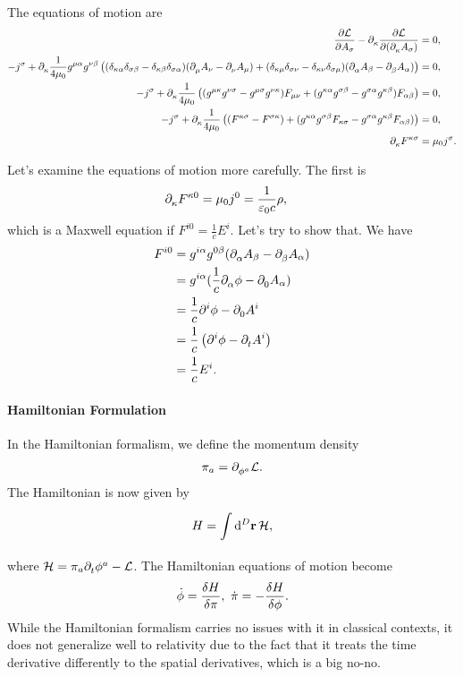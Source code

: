 The equations of motion are
\begin{align*}
	\pdv{\lag}{A_{\sigma}} - \del{\kappa}{\pdv{\lag}{(\del{\kappa}{A_{\sigma}})}} &= 0, \\
	-j^{\sigma} + \del{\kappa}{\frac{1}{4\mu_{0}}g^{\mu\alpha}g^{\nu\beta}\left((\delta_{\kappa\alpha}\delta_{\sigma\beta} - \delta_{\kappa\beta}\delta_{\sigma\alpha})(\del{\mu}{A_{\nu}} - \del{\nu}{A_{\mu}}) + (\delta_{\kappa\mu}\delta_{\sigma\nu} - \delta_{\kappa\nu}\delta_{\sigma\mu})(\del{\alpha}{A_{\beta}} - \del{\beta}{A_{\alpha}})\right)} &= 0, \\
	-j^{\sigma} + \del{\kappa}{\frac{1}{4\mu_{0}}\left((g^{\mu\kappa}g^{\nu\sigma} - g^{\mu\sigma}g^{\nu\kappa})F_{\mu\nu} + (g^{\kappa\alpha}g^{\sigma\beta} - g^{\sigma\alpha}g^{\kappa\beta})F_{\alpha\beta}\right)} &= 0, \\
	-j^{\sigma} + \del{\kappa}{\frac{1}{4\mu_{0}}\left((F^{\kappa\sigma} - F^{\sigma\kappa}) + (g^{\kappa\alpha}g^{\sigma\beta}F_{\kappa\sigma} - g^{\sigma\alpha}g^{\kappa\beta}F_{\alpha\beta})\right)} &= 0, \\
	\del{\kappa}{F^{\kappa\sigma}} &= \mu_{0}j^{\sigma}.
\end{align*}

Let's examine the equations of motion more carefully. The first is
\begin{align*}
	\del{\kappa}{F^{\kappa 0}} &= \mu_{0}j^{0} = \frac{1}{\varepsilon_{0}c}\rho,
\end{align*}
which is a Maxwell equation if $F^{i 0} = \frac{1}{c}E^{i}$. Let's try to show that. We have
\begin{align*}
	F^{i0} &= g^{i\alpha}g^{0\beta}(\del{\alpha}{A_{\beta}} - \del{\beta}{A_{\alpha}}) \\
	       &= g^{i\alpha}(\frac{1}{c}\del{\alpha}{\phi} - \del{0}{A_{\alpha}}) \\
	       &= \frac{1}{c}\del[i]{}{\phi} - \del{0}{A^{i}} \\
	       &= \frac{1}{c}\left(\del[i]{}{\phi} - \del{t}{A^{i}}\right) \\
	       &= \frac{1}{c}E^{i}.
\end{align*}

\paragraph{Hamiltonian Formulation}
In the Hamiltonian formalism, we define the momentum density
\begin{align*}
	\pi_{a} = \del{\phi^{a}}{\lag}.
\end{align*}
The Hamiltonian is now given by
\begin{align*}
	H = \integ[D]{}{}{\vb{r}}{\ham},
\end{align*}
where $\ham = \pi_{a}\del{t}{\phi^{a}} - \lag$. The Hamiltonian equations of motion become
\begin{align*}
	\dot{\phi} = \fdv{H}{\pi},\ \dot{\pi} = -\fdv{H}{\phi}.
\end{align*}
While the Hamiltonian formalism carries no issues with it in classical contexts, it does not generalize well to relativity due to the fact that it treats the time derivative differently to the spatial derivatives, which is a big no-no.

